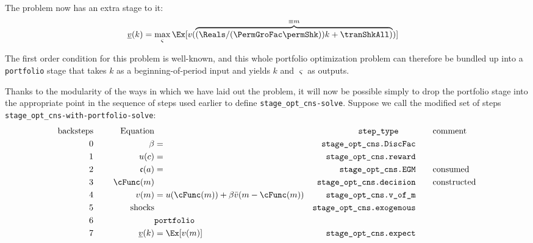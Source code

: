 \documentclass[\econtexRoot/BufferStockTheory]{subfiles}
\newcommand{\EOP}{\bar}
\newcommand{\MOP}{}
\newcommand{\BOP}{\underline}
\begin{document}
The problem now has an extra stage to it:
\begin{align*}
  \BOP{v}(k) & = \max_{\varsigma} \Ex[\MOP{v}(\overbrace{(\Reals/(\PermGroFac \permShk))k+\tranShkAll)}^{\equiv m})]
\end{align*}

The first order condition for this problem is well-known, and this whole portfolio optimization problem can therefore be bundled up into a \texttt{portfolio} stage that takes $k$ as a beginning-of-period input and yields $k$ and $\varsigma$ as outputs.

Thanks to the modularity of the ways in which we have laid out the problem, it will now be possible simply to drop the portfolio stage into the appropriate point in the sequence of steps used earlier to define \texttt{stage\_opt\_cns-solve}.  Suppose we call the modified set of steps \texttt{stage\_opt\_cns-with-portfolio-solve}:\pagebreak
\begin{alignat*}{3}
\text{backsteps} &      &   \notag \text{Equation} & \qquad                                    & \qquad \texttt{step\_type} \qquad  & \qquad \text{comment}
\\ 0             & ~~~~ & \beta                    & =                                         & \texttt{stage\_opt\_cns.DiscFac}   & %
\\ 1             & ~~~~ &   u(c)                   & =                                         & \texttt{stage\_opt\_cns.reward}    & 
\\ 2             & ~~~~ &   \mathfrak{c}(a)        & =                                         & \texttt{stage\_opt\_cns.EGM}       & \qquad \text{consumed}
\\ 3             & ~~~~ &   \cFunc(m)              &                                           & \texttt{stage\_opt\_cns.decision}  & \qquad \text{constructed} %
\\ 4             & ~~~~ & \MOP{v}(m)               & = u(\cFunc(m))+\beta \EOP{v}(m-\cFunc(m)) & \texttt{stage\_opt\_cns.v\_of\_m}  &
\\ 5             & ~~~~ & \text{shocks}            &                                           & \texttt{stage\_opt\_cns.exogenous} & %
\\ 6             & ~~~~ &                          & \texttt{portfolio}                        &
\\ 7             & ~~~~ & \BOP{v}(k)               & = \Ex[\MOP{v}(m)]                         & \texttt{stage\_opt\_cns.expect}    & %
\end{alignat*}
\end{document}

